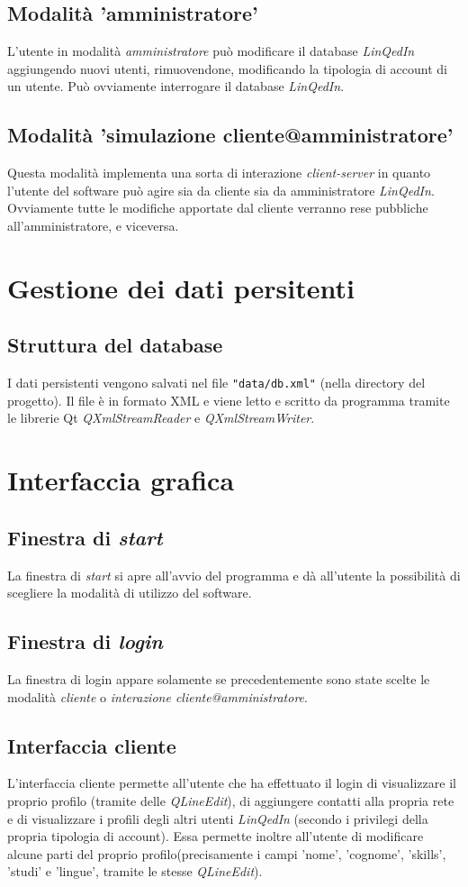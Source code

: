 \documentclass{article}
\begin{document}
\subsection {Modalità 'amministratore'}
L'utente in modalità \textit{amministratore} può modificare il database \textit{LinQedIn} aggiungendo
nuovi utenti, rimuovendone, modificando la tipologia di account di un utente. Può ovviamente interrogare il database
\textit{LinQedIn}.
\subsection {Modalità 'simulazione cliente@amministratore'}
Questa modalità implementa una sorta di interazione \textit{client-server} in quanto l'utente del software
può agire sia da cliente sia da amministratore \textit{LinQedIn}. Ovviamente tutte le modifiche apportate dal
cliente verranno rese pubbliche all'amministratore, e viceversa.

\section{Gestione dei dati persitenti}
\subsection {Struttura del database}
I dati persistenti vengono salvati nel file \texttt{"data/db.xml"} (nella directory del progetto).
Il file è in formato XML e viene letto e scritto da programma tramite le librerie Qt \textit{QXmlStreamReader}
e \textit{QXmlStreamWriter}.

\section{Interfaccia grafica}
\subsection {Finestra di \textit{start}}
La finestra di \textit{start} si apre all'avvio del programma e dà all'utente la possibilità di scegliere
la modalità di utilizzo del software.
\subsection {Finestra di \textit{login}}
La finestra di login appare solamente se precedentemente sono state scelte le modalità \textit{cliente} o
\textit{interazione cliente@amministratore}. 
\subsection {Interfaccia cliente}
L'interfaccia cliente permette all'utente che ha effettuato il login di visualizzare il proprio profilo (tramite delle \textit{QLineEdit}), di aggiungere contatti
alla propria rete e di visualizzare i profili degli altri utenti \textit{LinQedIn} (secondo i privilegi della propria tipologia di account).
Essa permette inoltre all'utente di modificare alcune parti del proprio profilo(precisamente i campi 'nome', 'cognome', 'skills', 'studi' e 'lingue', tramite le stesse \textit{QLineEdit}).
\end{document}
